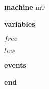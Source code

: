 \begin{block}
  \item   \textbf{machine} m0
  \item   \textbf{variables}
  \begin{block}
    \item   $free$
    \item   $live$
  \end{block}
  \item   
  \item   \textbf{events}
  \begin{block}
    \item   
    \item   
  \end{block}
  \item   \textbf{end} \\
\end{block}
